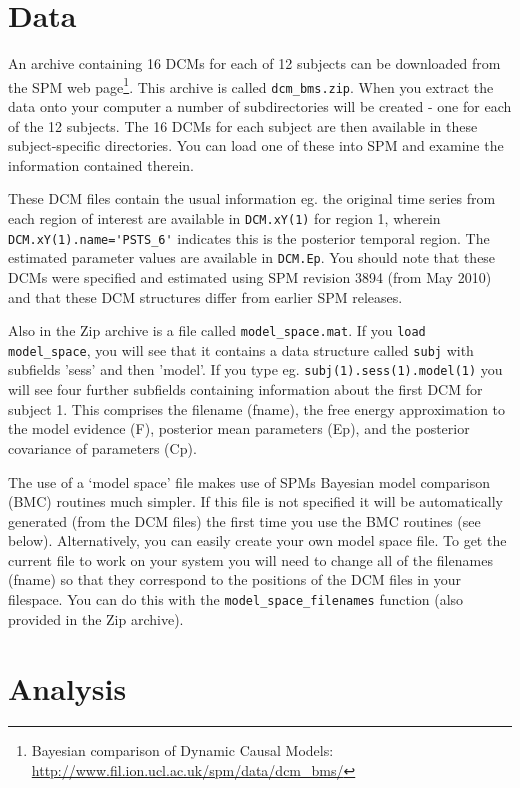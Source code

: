 \section{Data}

An archive containing 16 DCMs for each of 12 subjects can be downloaded from the 
SPM web page\footnote{Bayesian comparison of Dynamic Causal Models: \url{http://www.fil.ion.ucl.ac.uk/spm/data/dcm_bms/}}. This archive is called \verb!dcm_bms.zip!. When you extract the data onto your computer a number of subdirectories will be created - one for each of the 12 subjects. The 16 DCMs for each subject are then available in these subject-specific directories. You can load one of these into SPM and examine the information contained therein. 

These DCM files contain the usual information eg. the original time series from each region of interest are available in
\verb!DCM.xY(1)! for region 1, wherein \verb!DCM.xY(1).name='PSTS_6'! indicates this is the posterior temporal region. The estimated parameter values are available in \verb!DCM.Ep!. You should note that these DCMs were specified and estimated using SPM revision 3894 (from May 2010) and that these DCM structures 
differ from earlier SPM releases.

Also in the Zip archive is a file called \verb!model_space.mat!. If you \verb!load model_space!, you will see that it contains a data structure called \verb!subj! with subfields 'sess' and then 'model'. If you type eg. \verb!subj(1).sess(1).model(1)! you will see four further subfields containing information about the first DCM for subject 1. This comprises the filename (fname), the free energy approximation to the model evidence (F), posterior mean parameters (Ep), and the posterior covariance of parameters (Cp).

The use of a `model space' file makes use of SPMs Bayesian model comparison (BMC) routines much simpler. If this file is not specified it will be automatically generated (from the DCM files) the first time you use the BMC routines (see below). Alternatively, you can easily create your own model space file. To get the current file to work on your system you will need to change all of the filenames (fname) so that they correspond to the positions of the DCM files in your filespace. You can do this with the \verb!model_space_filenames! function (also provided in the Zip archive).

\section{Analysis}

